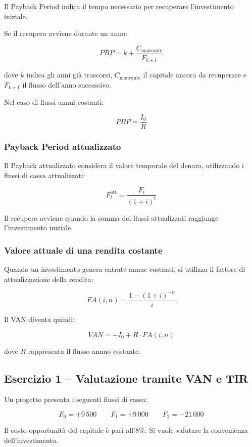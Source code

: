 \noindent Il Payback Period indica il tempo necessario
per recuperare l'investimento iniziale.

\noindent Se il recupero avviene durante un anno:

\[
\boxed{
PBP=k+\frac{C_{\text{mancante}}}{F_{k+1}}
}
\]

\noindent dove $k$ indica gli anni già trascorsi,
$C_{\text{mancante}}$ il capitale ancora da recuperare
e $F_{k+1}$ il flusso dell'anno successivo.

\noindent Nel caso di flussi annui costanti:

\[
\boxed{
PBP=\frac{I_0}{R}
}
\]

\subsubsection*{Payback Period attualizzato}

\noindent Il Payback attualizzato considera il valore temporale
del denaro, utilizzando i flussi di cassa attualizzati:

\[
\boxed{
F_t^{\text{att}}=\frac{F_t}{(1+i)^t}
}
\]

\noindent Il recupero avviene quando la somma dei flussi
attualizzati raggiunge l'investimento iniziale.

\subsubsection*{Valore attuale di una rendita costante}

\noindent Quando un investimento genera entrate annue costanti,
si utilizza il fattore di attualizzazione della rendita:

\[
\boxed{
FA(i,n)=\frac{1-(1+i)^{-n}}{i}
}
\]

\noindent Il VAN diventa quindi:

\[
\boxed{
VAN=-I_0+R\cdot FA(i,n)
}
\]

\noindent dove $R$ rappresenta il flusso annuo costante.


\subsection{Esercizio 1 -- Valutazione tramite VAN e TIR}

\noindent Un progetto presenta i seguenti flussi di cassa:

\[
F_0=+9\,500
\qquad
F_1=+9\,000
\qquad
F_2=-21\,000
\]

\noindent Il costo opportunità del capitale è pari all'8\%.
Si vuole valutare la convenienza dell'investimento.

